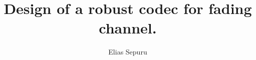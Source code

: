\documentclass[]{report}
\title{Design of a robust codec for fading channel.}
\author{Elias Sepuru}
\begin{document}
\maketitle

\begin{abstract}
\end{abstract}
\end{document}
